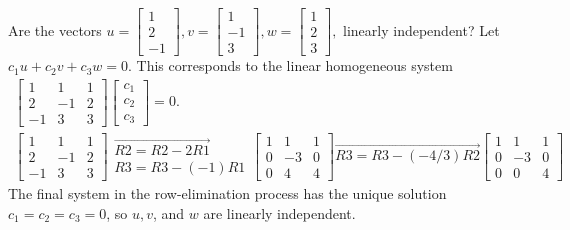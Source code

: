 \documentclass[../main.tex]{subfiles}
\begin{document}
\begin{example}  Are the vectors
\label{exm:exm_3_6}
$u =\left[\begin{array}{c}1\\2\\-1\end{array}\right],
v =\left[\begin{array}{c}1\\-1\\3\end{array}\right],
w =\left[\begin{array}{c}1\\2\\3\end{array}\right], $
linearly independent? Let $c_1 u + c_2 v + c_3 w = 0.$ This corresponds to the linear homogeneous system
$$
\begin{gathered}
{\left[\begin{array}{ccc}
	1 & 1 & 1 \\
	2 & -1 & 2 \\
	-1 & 3 & 3
	\end{array}\right]\left[\begin{array}{l}
	c_{1} \\
	c_{2} \\
	c_{3}
	\end{array}\right]=0 .} \\
{\left[\begin{array}{ccc}
	1 & 1 & 1 \\
	2 & -1 & 2 \\
	-1 & 3 & 3
	\end{array}\right] \begin{array}{c}
	\overrightarrow{R 2=R 2-2 R 1} \\
	R 3=R 3-(-1) R 1
	\end{array}\left[\begin{array}{ccc}
	1 & 1 & 1 \\
	0 & -3 & 0 \\
	0 & 4 & 4
	\end{array}\right] \overrightarrow{R 3=R 3-(-4 / 3) R 2}\left[\begin{array}{ccc}
	1 & 1 & 1 \\
	0 & -3 & 0 \\
	0 & 0 & 4
	\end{array}\right]}
\end{gathered}
$$
The final system in the row-elimination process has the unique solution $c_{1}=c_{2}=c_{3}=0$, so $u, v$, and $w$ are linearly independent.
\end{example}
\end{document}
